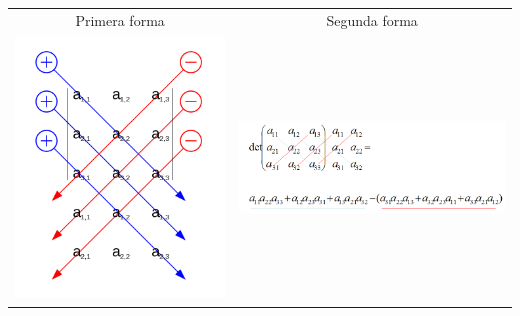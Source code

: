 \documentclass[stu, 12pt, letterpaper, donotrepeattitle, floatsintext, natbib]{apa7}
\begin{document}
\begin{table}
\begin{tabular}{cc}

Primera forma & Segunda forma \\
\includegraphics[scale=0.25]{sarrus}
&
\includegraphics[scale=0.5]{sarrus2}

\end{tabular}
\end{table}
\newpage
\renewcommand\refname{\large\textbf{Referencias}}

\end{document}
